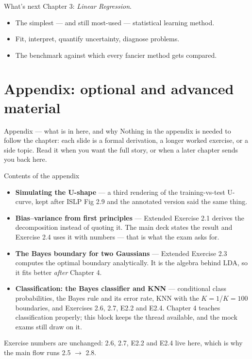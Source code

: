 \documentclass[aspectratio=169,11pt]{beamer}
\begin{document}
\begin{frame}{What's next}
  Chapter 3: \emph{Linear Regression}.
  \begin{itemize}
    \item The simplest --- and still most-used --- statistical learning
          method.
    \item Fit, interpret, quantify uncertainty, diagnose problems.
    \item The benchmark against which every fancier method gets
          compared.
  \end{itemize}
\end{frame}


\appendix
\AtBeginSection[]{}
\section{Appendix: optional and advanced material}

\begin{frame}{Appendix --- what is in here, and why}
  \footnotesize
  Nothing in the appendix is needed to follow the chapter: each slide is a
  formal derivation, a longer worked exercise, or a side topic. Read it when
  you want the full story, or when a later chapter sends you back here.
  \begin{block}{Contents of the appendix}
    \begin{itemize}
      \item \textbf{Simulating the U-shape} --- a third rendering of the training-vs-test U-curve, kept after ISLP Fig 2.9 and the annotated version said the same thing.
      \item \textbf{Bias--variance from first principles} --- Extended Exercise 2.1 derives the decomposition instead of quoting it. The main deck states the result and Exercise 2.4 uses it with numbers --- that is what the exam asks for.
      \item \textbf{The Bayes boundary for two Gaussians} --- Extended Exercise 2.3 computes the optimal boundary analytically. It is the algebra behind LDA, so it fits better \emph{after} Chapter 4.
      \item \textbf{Classification: the Bayes classifier and KNN} --- conditional class probabilities, the Bayes rule and its error rate, KNN with the $K=1$/$K=100$ boundaries, and Exercises 2.6, 2.7, E2.2 and E2.4. Chapter 4 teaches classification properly; this block keeps the thread available, and the mock exams still draw on it.
    \end{itemize}
  \end{block}
  \vspace{-1mm}
  Exercise numbers are unchanged: 2.6, 2.7, E2.2 and E2.4 live here, which is
  why the main flow runs 2.5 $\to$ 2.8.
\end{frame}
\end{document}
